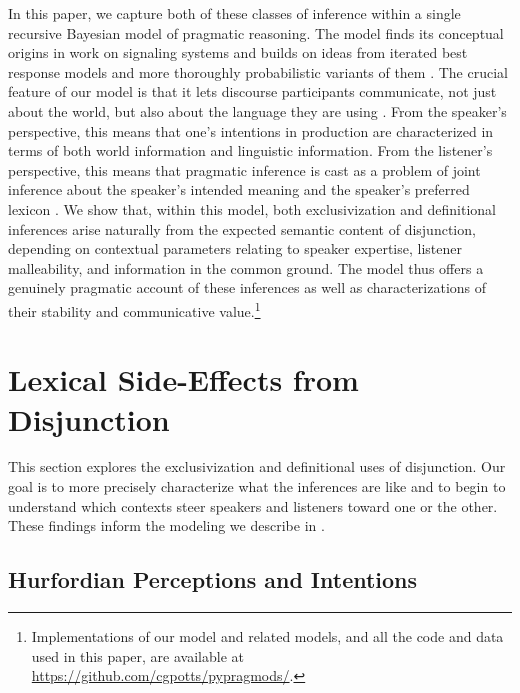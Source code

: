 \documentclass[12pt,twoside]{article}
\renewcommand{\_}{\textbf{\textunderscore\hspace{-4pt}\textunderscore\hspace{-3pt}\textunderscore\hspace{-4pt}\textunderscore}\hspace{0.5pt}}			%
\begin{document}
In this paper, we capture both of these classes of inference within a
single recursive Bayesian model of pragmatic reasoning. The model
finds its conceptual origins in  work on signaling
systems and builds on ideas from iterated best response models
\citep{Jaeger:2007,Jaeger:2011,Franke09DISS} and more thoroughly
probabilistic variants of them
\citep{CamererHo:2004,Frank:Goodman:2012}. The crucial feature of our
model is that it lets discourse participants communicate, not just
about the world, but also about the language they are using
\citep{Bergen:Goodman:Levy:2012,bergen-levy-goodman:2014}. From the
speaker's perspective, this means that one's intentions in production
are characterized in terms of both world information and linguistic
information. From the listener's perspective, this means that
pragmatic inference is cast as a problem of joint inference about the
speaker's intended meaning and the speaker's preferred lexicon
\citep{Smith:Goodman:Frank:2013}. We show that, within this model,
both exclusivization and definitional inferences arise naturally from
the expected semantic content of disjunction, depending on contextual
parameters relating to speaker expertise, listener malleability, and
information in the common ground. The model thus offers a genuinely
pragmatic account of these inferences as well as characterizations of
their stability and communicative value.\footnote{Implementations of
  our model and related models, and all the code and data used in this
  paper, are available at
  \url{https://github.com/cgpotts/pypragmods/}.}


\section{Lexical Side-Effects from Disjunction}\label{sec:data}

This section explores the exclusivization and definitional uses of
disjunction. Our goal is to more precisely characterize what the
inferences are like and to begin to understand which contexts steer
speakers and listeners toward one or the other. These findings inform
the modeling we describe in .


\subsection{Hurfordian Perceptions and Intentions}\label{sec:data:overlapping}
\end{document}
